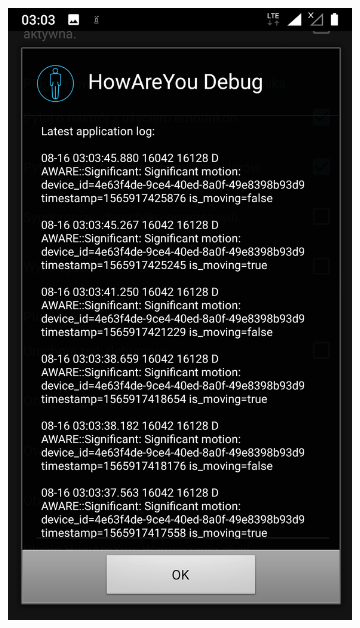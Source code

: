 \begin{figure}[H]
\centering
\begin{subfigure}{0.35\textwidth}
	\centering
	\includegraphics[scale=0.13]{rozdzial3/Ustawienia_logAplikacji.png}
	\subcaption{\label{subfigure_a}}
\end{subfigure}
\begin{subfigure}{0.35\textwidth}
	\centering

\end{subfigure}
\end{figure}
